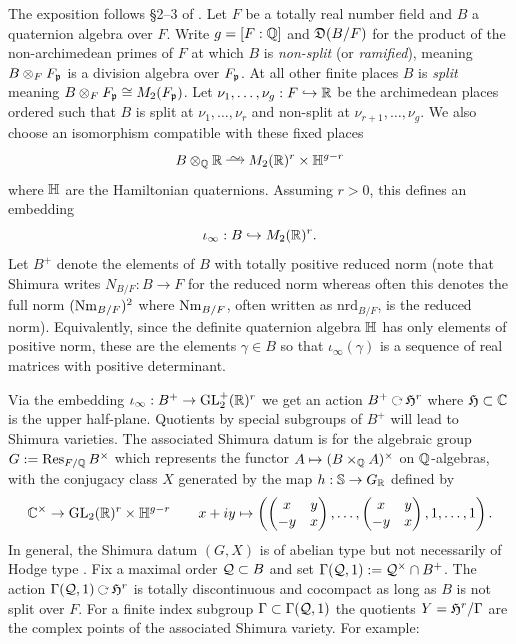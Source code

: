 \documentclass[main.tex]{subfiles}
\begin{document}
The exposition follows \S2--3 of \cite{shimura:curves}. Let $F$ be a totally real number field and $B$ a quaternion algebra over $F$. Write $g = [F : \mathbb{Q}]$ and $\mathfrak{D}(B/F)$ for the product of the non-archimedean primes of $F$ at which $B$ is \textit{non-split} (or \textit{ramified}), meaning $B \otimes_F F_{\mathfrak{p}}$ is a division algebra over $F_{\mathfrak{p}}$. 
At all other finite places $B$ is \textit{split} meaning $B \otimes_F F_{\mathfrak{p}} \cong M_2(F_{\mathfrak{p}})$. Let $\nu_1, \dots, \nu_g : F \hookrightarrow \mathbb{R}$ be the archimedean places ordered such that $B$ is split at $\nu_1, \dots, \nu_r$ and non-split at $\nu_{r+1}, \dots, \nu_{g}$. We also choose an isomorphism compatible with these fixed places
\[ B \ot_{\QQ} \RR \iso M_2(\RR)^r \times \HH^{g-r} \]
where $\mathbb{H}$ are the Hamiltonian quaternions. Assuming $r > 0$, this defines an embedding
\[ \iota_{\infty} : B \hookrightarrow M_2(\mathbb{R})^r. \]
Let $B^+$ denote the elements of $B$ with totally positive reduced norm (note that Shimura writes $N_{B/F} : B \to F$ for the reduced norm whereas often this denotes the full norm $(\operatorname{\mathrm{Nm}}_{B/F})^2$ where $\operatorname{\mathrm{Nm}}_{B/F}$, often written as $\mathrm{nrd}_{B/F}$, is the reduced norm).  Equivalently, since the definite quaternion algebra $\mathbb{H}$ has only elements of positive norm, these are the elements $\gamma \in B$ so that $\iota_{\infty}(\gamma)$ is a sequence of real matrices with positive determinant.
\par
Via the embedding $\iota_{\infty} : B^+ \to \mathrm{GL}_2^+(\mathbb{R})^r$ we get an action $B^+ \acts \frH^r$ where $\mathfrak{H} \subset \mathbb{C}$ is the upper half-plane. Quotients by special subgroups of $B^+$ will lead to Shimura varieties. The associated Shimura datum is for the algebraic group $G := \operatorname{\mathrm{Res}}_{F/\mathbb{Q}} B^\times$ which represents the functor $A \mapsto (B \times_{\mathbb{Q}} A)^\times$ on $\mathbb{Q}$-algebras, with the conjugacy class $X$ generated by the map $h : \mathbb{S} \to G_{\mathbb{R}}$ defined by
\[ \mathbb{C}^\times \to \mathrm{GL}_2(\mathbb{R})^r \times \mathbb{H}^{g-r} \quad \quad x + i y \mapsto \left( \begin{pmatrix}
    x & y
    \\
    -y & x
\end{pmatrix}, \dots, \begin{pmatrix}
    x & y
    \\
    -y & x
\end{pmatrix}, 1, \dots, 1 \right).  \]
In general, the Shimura datum $(G, X)$ is of abelian type but not necessarily of Hodge type \cite{milne:canonical_models}. Fix a maximal order $\mathcal{Q} \subset B$ and set $\Gamma(\mathcal{Q}, 1) := \mathcal{Q}^\times \cap B^+$. The action $\Gamma(\cQ, 1) \acts \frH^r$ is totally discontinuous and cocompact as long as $B$ is not split over $F$. For a finite index subgroup $\Gamma \subset \Gamma(\mathcal{Q}, 1)$ the quotients $Y = \mathfrak{H}^r / \Gamma$ are the complex points of the associated Shimura variety. For example:
\end{document}
